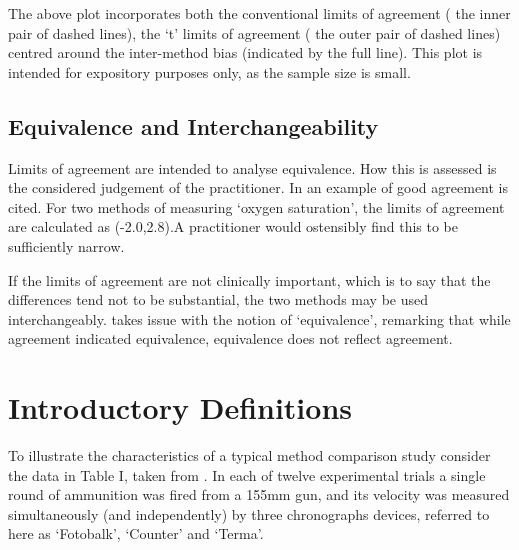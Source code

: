 \documentclass[12pt, a4paper]{report}
\begin{document}
	The above plot incorporates both the conventional limits of
	agreement ( the inner pair of dashed lines), the `t' limits of
	agreement ( the outer pair of dashed lines) centred around the
	inter-method bias (indicated by the full line). This plot is
	intended for expository purposes only, as the sample size is
	small.
	
	
	
	
	
	\subsection{Equivalence and Interchangeability}
	Limits of agreement are intended to analyse equivalence. How this
	is assessed is the considered judgement of the practitioner. In
	\citet{BA86} an example of good agreement is cited. For two
	methods of measuring `oxygen saturation', the limits of agreement
	are calculated as (-2.0,2.8).A practitioner would ostensibly find
	this to be sufficiently narrow.
	
	If the limits of agreement are not clinically important, which is
	to say that the differences tend not to be substantial, the two
	methods may be used interchangeably. \citet{DunnSEME} takes issue
	with the notion of `equivalence', remarking that while agreement
	indicated equivalence, equivalence does not reflect agreement.
	
	
	
	
	\section{Introductory Definitions}
	
	
	
	
	
	To illustrate the characteristics of a typical method comparison study consider the data in Table I, taken from \citet{Grubbs73}.
	\smallskip
	In each of twelve experimental trials a single round of ammunition was fired from a 155mm gun, and its velocity was measured
	simultaneously (and independently) by three chronographs devices, referred to here as `Fotobalk', `Counter' and `Terma'.
	\smallskip
	
	
	\newpage
	
\end{document}
